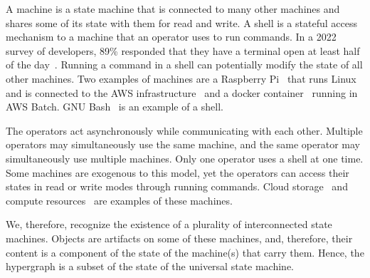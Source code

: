 A machine is a state machine that is connected to many other machines and shares some of its state with them for read and write. A shell is a stateful access mechanism to a machine that an operator uses to run commands. In a 2022 survey of developers, 89\% responded that they have a terminal open at least half of the day~\cite{textualize_founded}. Running a command in a shell can potentially modify the state of all other machines. Two examples of machines are a Raspberry Pi~\cite{rpi} that runs Linux and is connected to the AWS infrastructure~\cite{aws} and a docker container~\cite{docker} running in AWS Batch. GNU Bash~\cite{gnu_bash} is an example of a shell.

The operators act asynchronously while communicating with each other. Multiple operators may simultaneously use the same machine, and the same operator may simultaneously use multiple machines. Only one operator uses a shell at one time. Some machines are exogenous to this model, yet the operators can access their states in read or write modes through running commands. Cloud storage~\cite{aws_s3} and compute resources~\cite{aws_batch} are examples of these machines.

We, therefore, recognize the existence of a plurality of interconnected state machines. Objects are artifacts on some of these machines, and, therefore, their content is a component of the state of the machine(s) that carry them. Hence, the hypergraph is a subset of the state of the universal state machine.